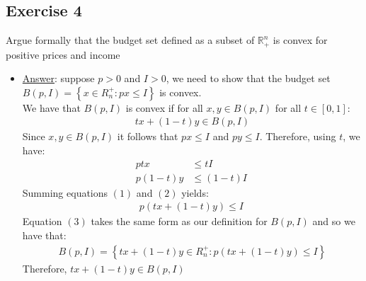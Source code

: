 \documentclass{article}
\begin{document}
\subsection{Exercise 4}
Argue formally that the budget set defined as a subset of $\mathbb{R}_{+}^{n}$ is convex for positive prices and income \par \vspace{0.3em}
\begin{itemize}
  \item  \underline{Answer}: suppose $p > 0$ and $I > 0$, we need to show that the budget set $B(p,I) = \left\{ x \in R^{+}_{n}: px \leq I \right\}$ is convex.\\ We have that $B(p, I)$ is convex if for all $x,y \in B(p,I)$ for all $t \in [0,1]$:
  \begin{gather*}
    tx + (1-t)y \in B(p, I)
  \end{gather*}
  Since $x, y \in B(p, I)$ it follows that $px \leq I$ and $py \leq I$. Therefore, using $t$, we have:
  \begin{align*}
    ptx &\leq tI \ \tag{1} \\
    p(1-t)y &\leq (1-t)I \ \tag{2}
  \end{align*}
  Summing equations $(1)$ and $(2)$ yields:
  \begin{gather*}
    p(tx + (1-t)y) \leq I \ \tag{3}
  \end{gather*}
  Equation $(3)$ takes the same form as our definition for $B(p,I)$ and so we have that:
  \begin{gather*}
    B(p,I) = \left\{ tx + (1-t)y \in R_{n}^{+}: p(tx + (1-t)y) \leq I \right\}
  \end{gather*}
  Therefore, $tx + (1-t)y \in B(p, I)$
\end{itemize}
\par
\vspace{6mm}
\end{document}
